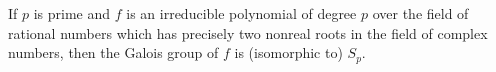 If $p$ is prime and $f$ is an irreducible polynomial of degree $p$ over the field of rational numbers which has precisely two nonreal roots in the field of complex numbers, then the Galois group of $f$ is (isomorphic to) $S_p$.
